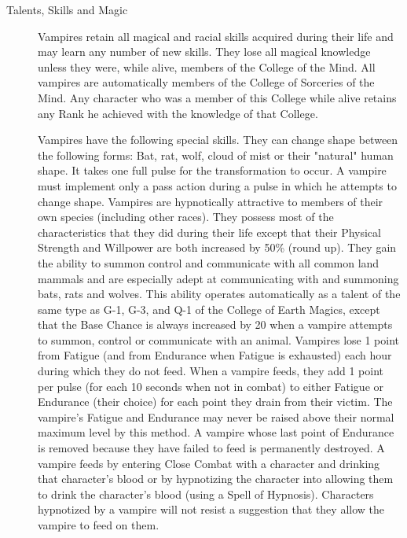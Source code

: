\begin{multicols}{2}
\begin{description}
\item[Talents, Skills and Magic] Vampires retain all magical and racial skills acquired
during their life and may learn any number of new skills. They lose
all magical knowledge unless they were, while alive, members of the
College of the Mind. All vampires are automatically members of the
College of Sorceries of the Mind. Any character who was a member of
this College while alive retains any Rank he achieved with the
knowledge of that College.

Vampires have the following special skills. They can change shape
between the following forms: Bat, rat, wolf, cloud of mist or their
"natural" human shape. It takes one full pulse for the transformation
to occur. A vampire must implement only a pass action during a pulse
in which he attempts to change shape. Vampires are hypnotically
attractive to members of their own species (including other races).
They possess most of the characteristics that they did during their
life except that their Physical Strength and Willpower are both
increased by 50\% (round up). They gain the ability to summon control
and communicate with all common land mammals and are especially adept
at communicating with and summoning bats, rats and wolves. This
ability operates automatically as a talent of the same type as G-1,
G-3, and Q-1 of the College of Earth Magics, except that the Base
Chance is always increased by 20 when a vampire attempts to summon,
control or communicate with an animal.  Vampires lose 1 point from
Fatigue (and from Endurance when Fatigue is exhausted) each hour
during which they do not feed.  When a vampire feeds, they add 1 point
per pulse (for each 10 seconds when not in combat) to either Fatigue
or Endurance (their choice) for each point they drain from their
victim. The vampire's Fatigue and Endurance may never be raised above
their normal maximum level by this method. A vampire whose last point
of Endurance is removed because they have failed to feed is
permanently destroyed. A vampire feeds by entering Close Combat with a
character and drinking that character's blood or by hypnotizing the
character into allowing them to drink the character's blood (using a
Spell of Hypnosis). Characters hypnotized by a vampire will not resist
a suggestion that they allow the vampire to feed on them.


\end{description}
\end{multicols}
